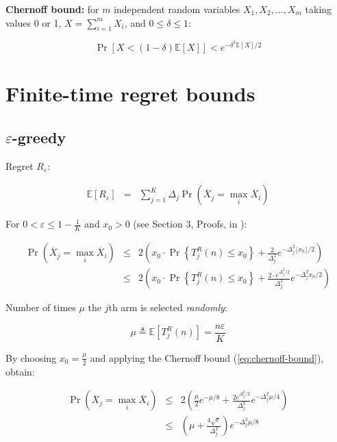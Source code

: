 \documentclass{article}
\newcommand {\IE} {\ensuremath {\mathbb{E}}}
\begin{document}
{\bf Chernoff bound:} for $m$ independent random variables $X_1, X_2, ..., X_m$
taking values 0 or 1, $X=\sum_{i=1}^m X_i$, and $0\le\delta\le 1$:

\begin{equation}
\label{eq:chernoff-bound}
\Pr[X < (1-\delta)\IE[X]] < e^{-\delta^2\IE[X]/2}
\end{equation}

\section{Finite-time regret bounds}

\subsection{$\varepsilon$-greedy}

Regret $R_\varepsilon$:

\begin{eqnarray}
\IE[R_\varepsilon]&=&\sum_{j=1}^K\Delta_j\Pr(\overline X_j=\max_i\overline X_i)
\end{eqnarray}

For $0<\varepsilon\le1-\frac 1 K$ and $x_0>0$ (see Section 3, Proofs, in \cite{Auer.ucb}):

\begin{eqnarray}
\Pr(\overline X_j=\max_i\overline X_i)&\le&2\left(x_0\cdot \Pr\left\{T_j^R(n)\le x_0\right\} + \frac 2{\Delta_j^2}e^{-\Delta_j^2\lfloor x_0 \rfloor/2}\right)\nonumber\\
&\le&2\left(x_0\cdot \Pr\left\{T_j^R(n)\le x_0\right\} + \frac {2 \cdot
  e^{\Delta_j^2/2}}{\Delta_j^2}e^{-\Delta_j^2 x_0 /2}\right)
\end{eqnarray}

Number of times $\mu$ the $j$th arm is selected {\it randomly}:

\begin{equation}
\mu\triangleq\IE\left[T_j^R(n)\right]=\frac {n\varepsilon} K
\end{equation}

By choosing $x_0=\frac \mu 2$ and applying the Chernoff bound (\ref{eq:chernoff-bound}), obtain:

\begin{eqnarray}
\Pr(\overline X_j=\max_i\overline X_i)&\le& 2\left(\frac {\mu}{2} e^{-\mu/8} + \frac {2e^{\Delta_j^2/2}}{\Delta_j^2}e^{-\Delta_j^2 \mu/4}\right)\nonumber\\
&\le&\left(\mu + \frac {4\sqrt e}{\Delta_j^2}\right)e^{-\Delta_j^2\mu/8}
\end{eqnarray}
\end{document}
